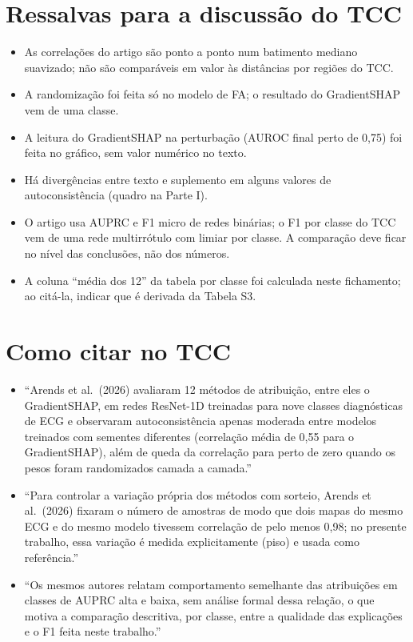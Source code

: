 \documentclass[11pt,a4paper]{article}
\begin{document}
\section{Ressalvas para a discussão do TCC}
\begin{itemize}
\item As correlações do artigo são ponto a ponto num batimento mediano suavizado; não são comparáveis em valor às distâncias por regiões do TCC.
\item A randomização foi feita só no modelo de FA; o resultado do GradientSHAP vem de uma classe.
\item A leitura do GradientSHAP na perturbação (AUROC final perto de 0,75) foi feita no gráfico, sem valor numérico no texto.
\item Há divergências entre texto e suplemento em alguns valores de autoconsistência (quadro na Parte I).
\item O artigo usa AUPRC e F1 micro de redes binárias; o F1 por classe do TCC vem de uma rede multirrótulo com limiar por classe. A comparação deve ficar no nível das conclusões, não dos números.
\item A coluna “média dos 12” da tabela por classe foi calculada neste fichamento; ao citá-la, indicar que é derivada da Tabela S3.
\end{itemize}

\section{Como citar no TCC}
\begin{itemize}
\item “Arends et al.\ (2026) avaliaram 12 métodos de atribuição, entre eles o GradientSHAP, em redes ResNet-1D treinadas para nove classes diagnósticas de ECG e observaram autoconsistência apenas moderada entre modelos treinados com sementes diferentes (correlação média de 0,55 para o GradientSHAP), além de queda da correlação para perto de zero quando os pesos foram randomizados camada a camada.”
\item “Para controlar a variação própria dos métodos com sorteio, Arends et al.\ (2026) fixaram o número de amostras de modo que dois mapas do mesmo ECG e do mesmo modelo tivessem correlação de pelo menos 0,98; no presente trabalho, essa variação é medida explicitamente (piso) e usada como referência.”
\item “Os mesmos autores relatam comportamento semelhante das atribuições em classes de AUPRC alta e baixa, sem análise formal dessa relação, o que motiva a comparação descritiva, por classe, entre a qualidade das explicações e o F1 feita neste trabalho.”
\end{itemize}
\end{document}
